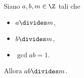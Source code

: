 \begin{lemma}
    Siano $a, b, m \in \Z$ tali che \begin{itemize}
        \item $a \divides m$,
        \item $b \divides m$,
        \item $\gcd{a}{b} = 1$.
    \end{itemize}
    Allora $ab \divides m$.
\end{lemma}